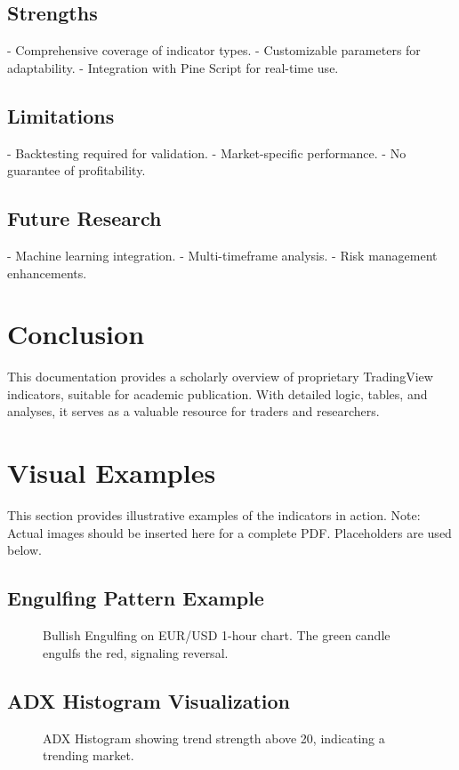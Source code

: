 \documentclass[12pt]{article}
\begin{document}
\subsection{Strengths}
- Comprehensive coverage of indicator types.
- Customizable parameters for adaptability.
- Integration with Pine Script for real-time use.

\subsection{Limitations}
- Backtesting required for validation.
- Market-specific performance.
- No guarantee of profitability.

\subsection{Future Research}
- Machine learning integration.
- Multi-timeframe analysis.
- Risk management enhancements.

\section{Conclusion}
\label{sec:conclusion}

This documentation provides a scholarly overview of proprietary TradingView indicators, suitable for academic publication. With detailed logic, tables, and analyses, it serves as a valuable resource for traders and researchers.

\section{Visual Examples}
\label{sec:visuals}

This section provides illustrative examples of the indicators in action. Note: Actual images should be inserted here for a complete PDF. Placeholders are used below.

\subsection{Engulfing Pattern Example}
\begin{figure}[H]
\centering
\caption{Bullish Engulfing on EUR/USD 1-hour chart. The green candle engulfs the red, signaling reversal.}
\label{fig:engulfing}
\end{figure}

\subsection{ADX Histogram Visualization}
\begin{figure}[H]
\centering
\caption{ADX Histogram showing trend strength above 20, indicating a trending market.}
\label{fig:adx}
\end{figure}
\end{document}
